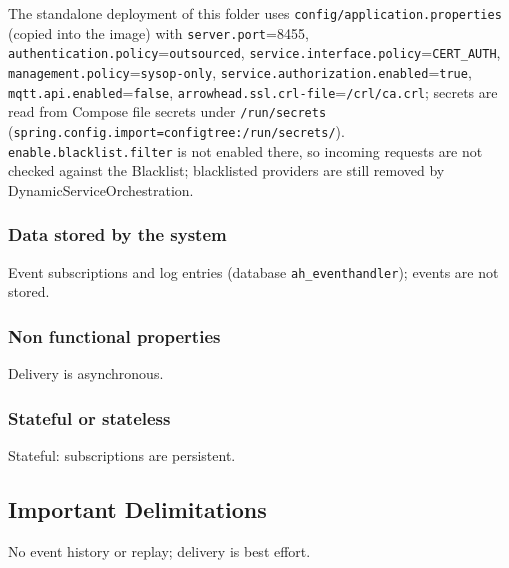 \documentclass[a4paper]{arrowhead}
\begin{document}
The standalone deployment of this folder uses \texttt{config/\allowbreak{}application.\allowbreak{}properties} (copied into the image) with \texttt{server.\allowbreak{}port}=8455, \texttt{authentication.\allowbreak{}policy}=\texttt{outsourced}, \texttt{service.\allowbreak{}interface.\allowbreak{}policy}=\texttt{CERT\_AUTH}, \texttt{management.\allowbreak{}policy}=\texttt{sysop-\allowbreak{}only}, \texttt{service.\allowbreak{}authorization.\allowbreak{}enabled}=\texttt{true}, \texttt{mqtt.\allowbreak{}api.\allowbreak{}enabled}=\texttt{false}, \texttt{arrowhead.\allowbreak{}ssl.\allowbreak{}crl-\allowbreak{}file}=\texttt{/\allowbreak{}crl/\allowbreak{}ca.\allowbreak{}crl}; secrets are read from Compose file secrets under \texttt{/\allowbreak{}run/\allowbreak{}secrets} (\texttt{spring.\allowbreak{}config.\allowbreak{}import=\allowbreak{}configtree:\allowbreak{}/\allowbreak{}run/\allowbreak{}secrets/}). \texttt{enable.\allowbreak{}blacklist.\allowbreak{}filter} is not enabled there, so incoming requests are not checked against the Blacklist; blacklisted providers are still removed by Dynamic\allowbreak{}Service\allowbreak{}Orchestration.

\subsubsection{Data stored by the system}

Event subscriptions and log entries (database \texttt{ah\_\allowbreak{}eventhandler}); events are not stored.

\subsubsection{Non functional properties}

Delivery is asynchronous.

\subsubsection{Stateful or stateless}

Stateful: subscriptions are persistent.

\subsection{Important Delimitations}
\label{sec:delimitations}

No event history or replay; delivery is best effort.

\newpage
\end{document}
